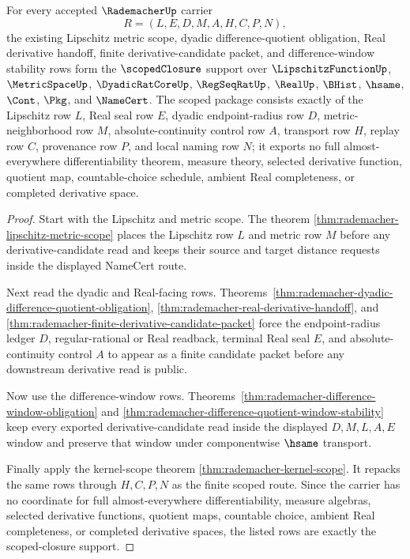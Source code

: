 \begin{theorem}
\label{thm:rademacher-scope-closure-package}
For every accepted $\RademacherUp$ carrier
$$
R=(L,E,D,M,A,H,C,P,N),
$$
the existing Lipschitz metric scope, dyadic difference-quotient obligation, Real derivative handoff, finite derivative-candidate packet, and difference-window stability rows form the $\scopedClosure$ support over $\LipschitzFunctionUp$, $\MetricSpaceUp$, $\DyadicRatCoreUp$, $\RegSeqRatUp$, $\RealUp$, $\BHist$, $\hsame$, $\Cont$, $\Pkg$, and $\NameCert$. The scoped package consists exactly of the Lipschitz row $L$, Real seal row $E$, dyadic endpoint-radius row $D$, metric-neighborhood row $M$, absolute-continuity control row $A$, transport row $H$, replay row $C$, provenance row $P$, and local naming row $N$; it exports no full almost-everywhere differentiability theorem, measure theory, selected derivative function, quotient map, countable-choice schedule, ambient Real completeness, or completed derivative space.
\end{theorem}
\begin{proof}
Start with the Lipschitz and metric scope. The theorem \autoref{thm:rademacher-lipschitz-metric-scope} places the Lipschitz row $L$ and metric row $M$ before any derivative-candidate read and keeps their source and target distance requests inside the displayed NameCert route.

Next read the dyadic and Real-facing rows. Theorems~\ref{thm:rademacher-dyadic-difference-quotient-obligation}, \ref{thm:rademacher-real-derivative-handoff}, and \ref{thm:rademacher-finite-derivative-candidate-packet} force the endpoint-radius ledger $D$, regular-rational or Real readback, terminal Real seal $E$, and absolute-continuity control $A$ to appear as a finite candidate packet before any downstream derivative read is public.

Now use the difference-window rows. Theorems~\ref{thm:rademacher-difference-window-obligation} and \ref{thm:rademacher-difference-quotient-window-stability} keep every exported derivative-candidate read inside the displayed $D,M,L,A,E$ window and preserve that window under componentwise $\hsame$ transport.

Finally apply the kernel-scope theorem \autoref{thm:rademacher-kernel-scope}. It repacks the same rows through $H,C,P,N$ as the finite scoped route. Since the carrier has no coordinate for full almost-everywhere differentiability, measure algebras, selected derivative functions, quotient maps, countable choice, ambient Real completeness, or completed derivative spaces, the listed rows are exactly the scoped-closure support.
\end{proof}

